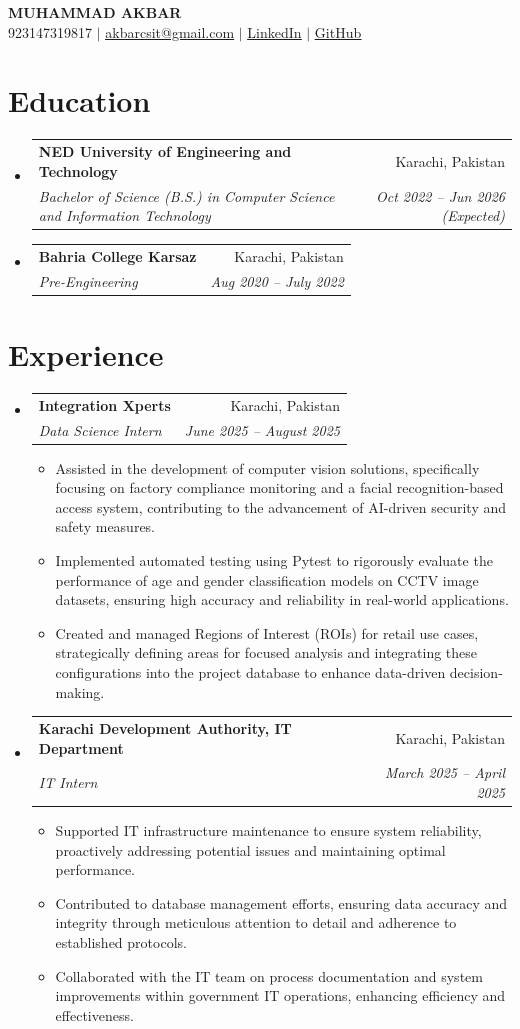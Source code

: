 \documentclass[letterpaper,11pt]{article}
\makeatletter
\newcommand{\resumeItem}[1]{
  \item\small{
    {#1 \vspace{-2pt}}
  }
}
\newcommand{\resumeSubheading}[4]{
  \vspace{-2pt}\item
    \begin{tabular*}{0.97\textwidth}[t]{l@{\extracolsep{\fill}}r}
      \textbf{#1} & #2 \\
      \textit{\small#3} & \textit{\small #4} \\
    \end{tabular*}\vspace{-7pt}
}
\newcommand{\resumeSubHeadingListStart}{\begin{itemize}[leftmargin=0.15in, label={}]}
\newcommand{\resumeSubHeadingListEnd}{\end{itemize}}
\newcommand{\resumeItemListStart}{\begin{itemize}}
\newcommand{\resumeItemListEnd}{\end{itemize}\vspace{-5pt}}
\makeatother
\begin{document}
\begin{center}
    \textbf{\Huge \scshape MUHAMMAD AKBAR} \\ \vspace{1pt}
    \small 923147319817 $|$ \href{mailto:akbarcsit@gmail.com}{\underline{akbarcsit@gmail.com}} $|$ 
    \href{https://www.linkedin.com/in/muhammad-akbar-0b7767270}{\underline{LinkedIn}} $|$
    \href{https://github.com/muakbar04}{\underline{GitHub}}
\end{center}


\section{Education}
  \resumeSubHeadingListStart
        \resumeSubheading
      {NED University of Engineering and Technology}{Karachi, Pakistan}
      {Bachelor of Science (B.S.) in Computer Science and Information Technology}{Oct 2022 – Jun 2026 (Expected)}
        \resumeSubheading
      {Bahria College Karsaz}{Karachi, Pakistan}
      {Pre-Engineering}{Aug 2020 – July 2022}
      \resumeSubHeadingListEnd


\section{Experience}
  \resumeSubHeadingListStart
        \resumeSubheading
      {Integration Xperts}{Karachi, Pakistan}
      {Data Science Intern}{June 2025 – August 2025}
      \resumeItemListStart
                \resumeItem{Assisted in the development of computer vision solutions, specifically focusing on factory compliance monitoring and a facial recognition-based access system, contributing to the advancement of AI-driven security and safety measures.}
                \resumeItem{Implemented automated testing using Pytest to rigorously evaluate the performance of age and gender classification models on CCTV image datasets, ensuring high accuracy and reliability in real-world applications.}
                \resumeItem{Created and managed Regions of Interest (ROIs) for retail use cases, strategically defining areas for focused analysis and integrating these configurations into the project database to enhance data-driven decision-making.}
              \resumeItemListEnd
        \resumeSubheading
      {Karachi Development Authority, IT Department}{Karachi, Pakistan}
      {IT Intern}{March 2025 – April 2025}
      \resumeItemListStart
                \resumeItem{Supported IT infrastructure maintenance to ensure system reliability, proactively addressing potential issues and maintaining optimal performance.}
                \resumeItem{Contributed to database management efforts, ensuring data accuracy and integrity through meticulous attention to detail and adherence to established protocols.}
                \resumeItem{Collaborated with the IT team on process documentation and system improvements within government IT operations, enhancing efficiency and effectiveness.}
              \resumeItemListEnd
      \resumeSubHeadingListEnd
\end{document}
